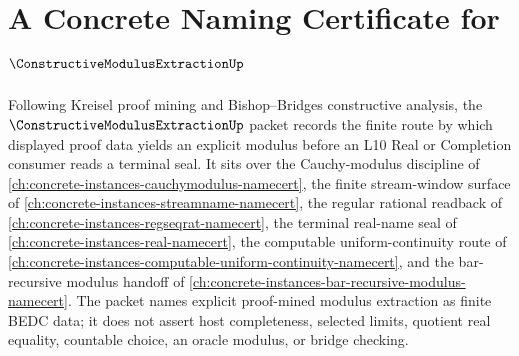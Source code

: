 \chapter{A Concrete Naming Certificate for $\ConstructiveModulusExtractionUp$}
\label{ch:concrete-instances-constructive-modulus-extraction-namecert}

Following Kreisel proof mining and Bishop--Bridges constructive analysis, the $\ConstructiveModulusExtractionUp$ packet records the finite route by which displayed proof data yields an explicit modulus before an L10 Real or Completion consumer reads a terminal seal. It sits over the Cauchy-modulus discipline of \autoref{ch:concrete-instances-cauchymodulus-namecert}, the finite stream-window surface of \autoref{ch:concrete-instances-streamname-namecert}, the regular rational readback of \autoref{ch:concrete-instances-regseqrat-namecert}, the terminal real-name seal of \autoref{ch:concrete-instances-real-namecert}, the computable uniform-continuity route of \autoref{ch:concrete-instances-computable-uniform-continuity-namecert}, and the bar-recursive modulus handoff of \autoref{ch:concrete-instances-bar-recursive-modulus-namecert}. The packet names explicit proof-mined modulus extraction as finite BEDC data; it does not assert host completeness, selected limits, quotient real equality, countable choice, an oracle modulus, or bridge checking.

